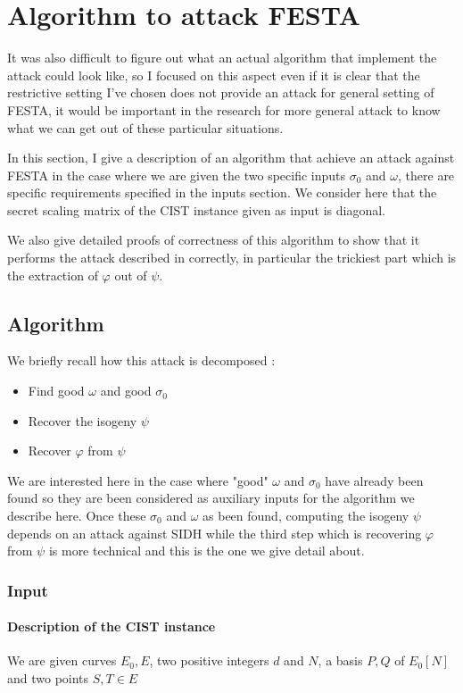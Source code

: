 \documentclass[12pt,a4paper]{article}
\begin{document}
\section{Algorithm to attack FESTA}


		It was also difficult to figure out what an actual algorithm that implement the attack could look
		like, so I focused on this aspect even if it is clear that the restrictive setting I've chosen does
		not provide an attack for general setting of FESTA, it would be important in the research for more
		general attack to know what we can get out of these particular situations.

		In this section, I give a description of an algorithm that achieve an attack against FESTA in the
		case where we are given the two specific inputs $\sigma_0$ and $\omega$, there are specific
		requirements specified in the inputs section. We consider here that the secret scaling matrix of the
		CIST instance given as input is diagonal.

		We also give detailed proofs of correctness of this algorithm to show that it performs the attack
		described in \cite{polyCIST} correctly, in particular the trickiest part which is the extraction
		of $\varphi$ out of $\psi$.

		\subsection{Algorithm}


		We briefly recall how this attack is decomposed :
		\begin{itemize}
			\item Find good $\omega$ and good $\sigma_0$ 
			\item Recover the isogeny $\psi$
			\item Recover $\varphi$ from $\psi$
		\end{itemize}
		We are interested here in the case where "good" $\omega$ and $\sigma_0$ have already been found
		so they are been considered as auxiliary inputs for the algorithm we describe here. Once these
		$\sigma_0$ and $\omega$ as been found, computing the isogeny $\psi$ depends on an attack against
		SIDH while the third step which is recovering $\varphi$ from $\psi$ is more technical and this
		is the one we give detail about.

		\subsubsection{Input}
		\paragraph{Description of the CIST instance}
		We are given curves $E_0,E$, two positive integers $d$ and $N$, a basis $P,Q$ of $E_0[N]$ and
		two points  $S,T\in E$
\end{document}
